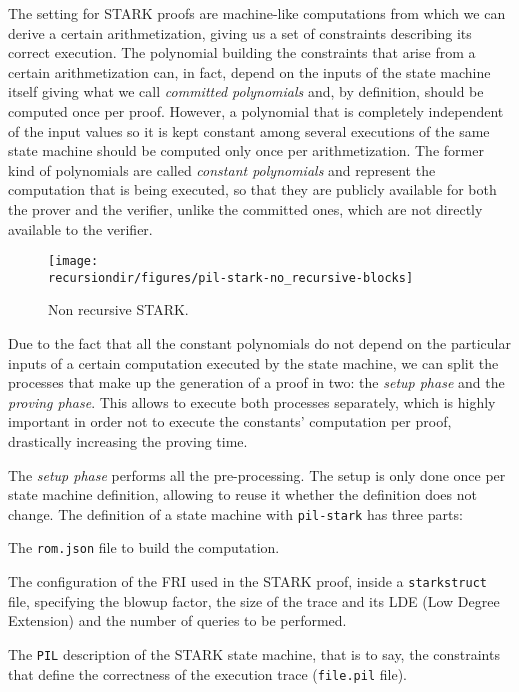 The setting for STARK proofs are machine-like computations from which we can derive a certain arithmetization, 
giving us a set of constraints describing its correct execution. 
The polynomial building the constraints that arise from a certain arithmetization can, 
in fact, depend on the inputs of the state machine itself giving what we call \textit{committed polynomials} and, 
by definition, should be computed once per proof. 
However, a polynomial that is completely independent of the input values so it is kept constant among several executions of the same state machine should be computed only once per arithmetization. 
The former kind of polynomials are called \textit{constant polynomials} and represent the computation that is being executed, so that they are publicly available for both the prover and the verifier, unlike the committed ones, which are not directly available to the verifier.


\begin{figure}[H]
\centering
\texttt{[image: \\recursiondir/figures/pil-stark-no\_recursive-blocks]}
\caption{Non recursive STARK.}
\label{fig:non-recursive}
\end{figure}

Due to the fact that all the constant polynomials do not depend on the particular inputs of a certain computation executed by the state machine, we can split the processes that make up the generation of a proof in two: the \textit{setup phase} and the \textit{proving phase}. 
This allows to execute both processes separately, which is highly important in order not to execute the constants' computation per proof, drastically increasing the proving time. 

The \textit{setup phase} performs all the pre-processing. 
The setup is only done once per state machine definition, allowing to reuse it whether the definition does not change. 
The definition of a state machine with \texttt{pil-stark} has three parts:

\begin{compactitem}
\item The \texttt{rom.json} file to build the computation.
\item The configuration of the FRI used in the STARK proof, inside a \texttt{starkstruct} file, specifying the blowup factor, the size of the trace and its LDE (Low Degree Extension) and the number of queries to be performed.
\item The \texttt{PIL} description of the STARK state machine, that is to say, the constraints that define the correctness of the execution trace (\texttt{file.pil} file).
\end{compactitem}

